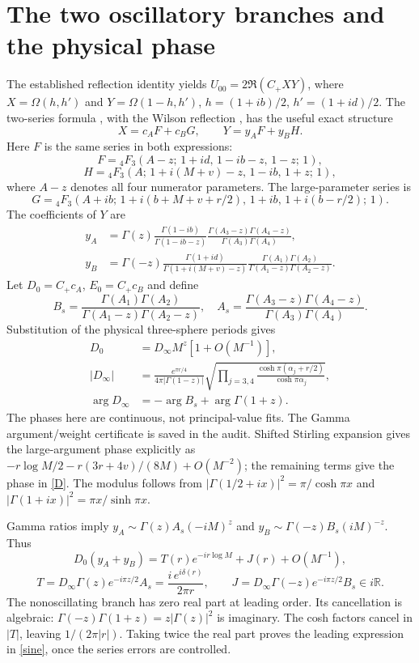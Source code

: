 \documentclass[11pt,a4paper]{article}
\begin{document}
\newpage
\section{The two oscillatory branches and the physical phase}
The established reflection identity yields
$U_{00}=2\Re(C_+XY)$, where $X=\Omega(h,h')$ and
$Y=\Omega(1-h,h')$, $h=(1+ib)/2$, $h'=(1+id)/2$.
The two-series formula \cite{lprs}, with the Wilson reflection
\cite{wilson}, has the useful exact structure
\[
 X=c_AF+c_BG,\qquad Y=y_AF+y_BH .
\]
Here $F$ is the same series in both expressions:
\[
 F={}_4F_3(A-z;\,1+id,\,1-ib-z,\,1-z;\,1),
\]
\[
 H={}_4F_3(A;\,1+i(M+v)-z,\,1-ib,\,1+z;\,1),
\]
where $A-z$ denotes all four numerator parameters.
The large-parameter series is
\[
 G={}_4F_3(A+ib;\,1+i(b+M+v+r/2),\,1+ib,\,1+i(b-r/2);\,1).
\]
The coefficients of $Y$ are
\begin{align*}
 y_A&=\Gamma(z)\frac{\Gamma(1-ib)}{\Gamma(1-ib-z)}
             \frac{\Gamma(A_3-z)\Gamma(A_4-z)}
                  {\Gamma(A_3)\Gamma(A_4)},\\
 y_B&=\Gamma(-z)\frac{\Gamma(1+id)}{\Gamma(1+i(M+v)-z)}
             \frac{\Gamma(A_1)\Gamma(A_2)}
                  {\Gamma(A_1-z)\Gamma(A_2-z)}.
\end{align*}
Let $D_0=C_+c_A$, $E_0=C_+c_B$ and define
\[
 B_s=\frac{\Gamma(A_1)\Gamma(A_2)}
            {\Gamma(A_1-z)\Gamma(A_2-z)},\quad
 A_s=\frac{\Gamma(A_3-z)\Gamma(A_4-z)}
            {\Gamma(A_3)\Gamma(A_4)}.
\]
Substitution of the physical three-sphere periods gives
\begin{align}
 D_0&=D_\infty M^z[1+O(M^{-1})],\nonumber\\
 |D_\infty|&=\frac{e^{\pi r/4}}{4\pi|\Gamma(1-z)|}
 \sqrt{\prod_{j=3,4}
 \frac{\cosh\pi(\alpha_j+r/2)}{\cosh\pi\alpha_j}},\nonumber\\
 \arg D_\infty&=-\arg B_s+\arg\Gamma(1+z).
 \label{D}
\end{align}
The phases here are continuous, not principal-value fits. The Gamma
argument/weight certificate is saved in the audit. Shifted Stirling
expansion \cite{dlmf} gives the large-argument phase explicitly as
$-r\log M/2-r(3r+4v)/(8M)+O(M^{-2})$; the remaining terms give
the phase in \eqref{D}. The modulus follows from
$|\Gamma(1/2+ix)|^2=\pi/\cosh\pi x$ and
$|\Gamma(1+ix)|^2=\pi x/\sinh\pi x$.

Gamma ratios imply $y_A\sim\Gamma(z)A_s(-iM)^z$ and
$y_B\sim\Gamma(-z)B_s(iM)^{-z}$. Thus
\[
 D_0(y_A+y_B)=T(r)e^{-ir\log M}+J(r)+O(M^{-1}),
\]
\[
 T=D_\infty\Gamma(z)e^{-i\pi z/2}A_s
   =\frac{i\,e^{i\delta(r)}}{2\pi r},\qquad
 J=D_\infty\Gamma(-z)e^{-i\pi z/2}B_s\in i\mathbb R .
\]
The nonoscillating branch has zero real part at leading order.
Its cancellation is algebraic: $\Gamma(-z)\Gamma(1+z)
=z|\Gamma(z)|^2$ is imaginary. The cosh factors cancel in $|T|$,
leaving $1/(2\pi|r|)$. Taking twice the real part proves the
leading expression in \eqref{sine}, once the series errors are controlled.
\end{document}
